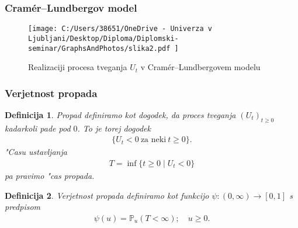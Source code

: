 \documentclass[]{beamer} %
\theoremstyle{plain}
\newtheorem{definicija}{Definicija}
\newcommand{\Prob}{\mathbb{P}}
\begin{document}
\begin{frame}
  \frametitle{Cramér--Lundbergov model}
  \begin{figure}[H]
    \centering
    \texttt{[image: 
        C:/Users/38651/OneDrive - Univerza v Ljubljani/Desktop/Diploma/Diplomski-seminar/GraphsAndPhotos/slika2.pdf
        ]}
    \label{fig:slika2}
    \caption{Realizaciji procesa tveganja $U_t$ v Cramér--Lundbergovem modelu}
\end{figure}
\end{frame}

\begin{frame}
  \frametitle{Verjetnost propada}
  \begin{definicija}
    \textit{Propad} definiramo kot dogodek, da proces tveganja $(U_t)_{t\geq0}$ kadarkoli pade pod $0$. 
    To je torej dogodek 
    \begin{align*}
        \bigl\{U_t<0 \ \text{za neki} \ t\geq 0\bigr\}.
    \end{align*}
    "Casu ustavljanja
    \begin{align*}
        T = \inf\{t\geq0 \mid U_t < 0\}
    \end{align*}
    pa pravimo \textit{"cas propada}.
  \end{definicija}
  \pause
  \begin{definicija}
      \textit{Verjetnost propada} definiramo kot funkcijo $\psi: (0,\infty) \to [0,1]$ 
      s predpisom
      \begin{align*}
          \psi(u) = \Prob_u(T<\infty); \quad u\geq0.
      \end{align*}
  \end{definicija}
\end{frame}
\end{document}
